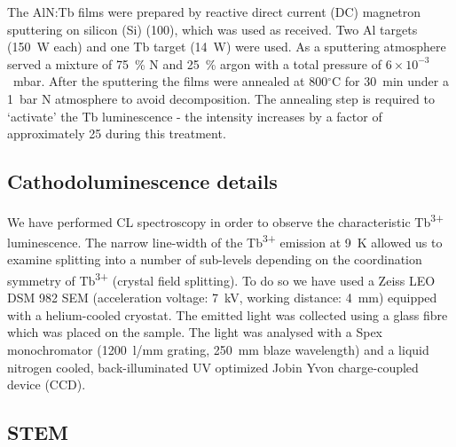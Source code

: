 \documentclass[%
aip,
rsi,%
 amsmath,amssymb,%
 reprint,%
]{revtex4-1}
\begin{document}
The AlN:Tb films were prepared by reactive direct current (DC) magnetron sputtering on silicon (Si) (100), which was used as received. Two Al targets (150~W each) and one Tb target (14~W) were used. As a sputtering atmosphere served a mixture of 75~\% N and 25~\% argon with a total pressure of $6 \times 10^{-3}$~mbar. After the sputtering the films were annealed at 800$^\circ$C for 30~min under a 1~bar N atmosphere to avoid decomposition. The annealing step is required to \lq{activate}\rq{} the Tb luminescence - the intensity increases by a factor of approximately 25 during this treatment.

\subsection{Cathodoluminescence details}
\label{sec:CL}

We have performed CL spectroscopy in order to observe the characteristic Tb\textsuperscript{3+} luminescence. The narrow line-width of the Tb\textsuperscript{3+} emission at 9~K allowed us to examine splitting into a number of sub-levels depending on the coordination symmetry of Tb\textsuperscript{3+} (crystal field splitting). To do so we have used a Zeiss LEO DSM 982 SEM \cite{Schirra2007} (acceleration voltage: 7~kV,  working distance: 4~mm) equipped with a helium-cooled cryostat. The emitted light was collected using a glass fibre which was placed on the sample. The light was analysed with a Spex monochromator (1200~l/mm grating, 250~mm blaze wavelength) and a liquid nitrogen cooled, back-illuminated UV optimized Jobin Yvon charge-coupled device (CCD).

\subsection{STEM}
\label{sec:STEM}
\end{document}
